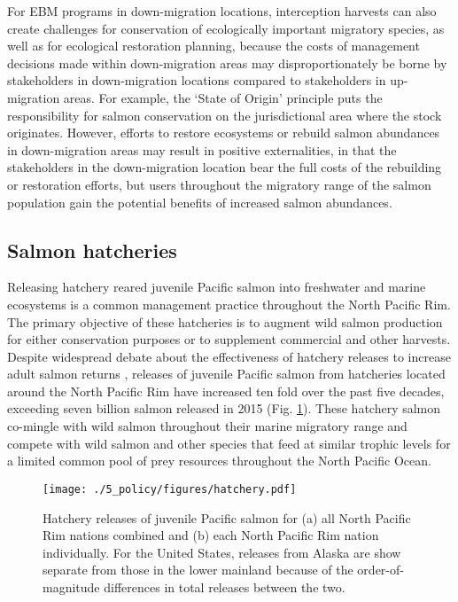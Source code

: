 For EBM programs in down-migration locations, interception harvests can also
create challenges for conservation of ecologically important migratory species,
as well as for ecological restoration planning, because the costs of management
decisions made within down-migration areas may disproportionately be borne by
stakeholders in down-migration locations compared to stakeholders in
up-migration areas. For example, the `State of Origin' principle puts the
responsibility for salmon conservation on the jurisdictional area where the
stock originates. However, efforts to restore ecosystems or rebuild salmon
abundances in down-migration areas may result in positive externalities, in that
the stakeholders in the down-migration location bear the full costs of the
rebuilding or restoration efforts, but users throughout the migratory range of
the salmon population gain the potential benefits of increased salmon
abundances.


\subsection{Salmon hatcheries}

Releasing hatchery reared juvenile Pacific salmon into freshwater and marine
ecosystems is a common management practice throughout the North Pacific Rim. The
primary objective of these hatcheries is to augment wild salmon production for
either conservation purposes or to supplement commercial and other harvests.
Despite widespread debate about the effectiveness of hatchery releases to
increase adult salmon returns \citep{Hilborn2000a, Wertheimer2001a,
Hilborn2001a}, releases of juvenile Pacific salmon from hatcheries located
around the North Pacific Rim have increased ten fold over the past five decades,
exceeding seven billion salmon released in 2015 (Fig. \ref{fig:ebm:3}). These
hatchery salmon co-mingle with wild salmon throughout their marine migratory
range and compete with wild salmon and other species that feed at similar
trophic levels for a limited common pool of prey resources throughout the North
Pacific Ocean.

\begin{figure}[htbp]
  \centering \texttt{[image: ./5\_policy/figures/hatchery.pdf]}
  \caption[Hatchery releases of juvenile Pacific salmon from North Pacific Rim
           nations.]{Hatchery releases of juvenile Pacific salmon for (a) all
           North Pacific Rim nations combined and (b) each North Pacific Rim
           nation individually. For the United States, releases from Alaska are
           show separate from those in the lower mainland because of the
           order-of-magnitude differences in total releases between the two.}
  \label{fig:ebm:3}
\end{figure}

